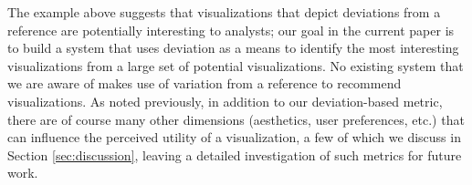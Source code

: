 




\noindent The example above suggests that visualizations that depict
deviations from a reference are potentially interesting to analysts;
our goal in the current paper is to build a system 
that uses deviation as a means to identify
the most interesting visualizations from a large set of potential visualizations.
No existing system that we are aware of makes use of variation from a reference
to recommend visualizations.  
As noted previously, in addition to our deviation-based metric,
there are of course many other dimensions (aesthetics, user
preferences, etc.) that can influence the perceived utility of a
visualization, a few of which we discuss in Section
\ref{sec:discussion}, leaving a detailed investigation of such metrics
for future work.


